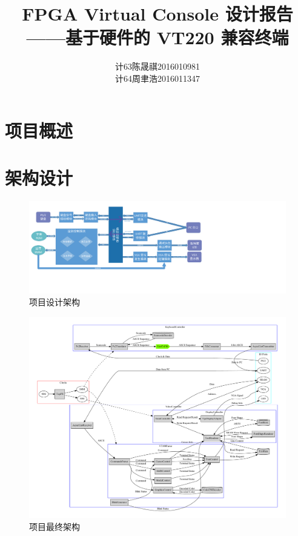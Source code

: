 \documentclass[fontset=adobe]{ctexart}
\newcommand{\arttitle}{FPGA Virtual Console 设计报告}
\newcommand{\artsubject}{基于硬件的 VT220 兼容终端}
\begin{document}
\title{{\bf\arttitle\\——\artsubject}}
\author{
计63\hspace{1em}陈晟祺\hspace{1em}2016010981 \\
计64\hspace{1em}周聿浩\hspace{1em}2016011347
}
\date{}
\maketitle

\tableofcontents

\section{项目概述}

\section{架构设计}

\begin{figure}[htbp]
\centerline{
\includegraphics[width=0.95\paperwidth]{architecture_design_visio.pdf}
}
\label{fig:design_architecture}
\caption{项目设计架构}
\end{figure}

\begin{figure}[htbp]
\centerline{
\includegraphics[width=\paperwidth]{architecture_final_dot.pdf}
}
\label{fig:final_architecture}
\caption{项目最终架构}
\end{figure}
\end{document}
